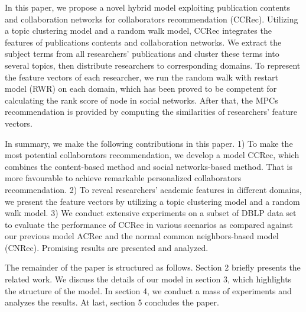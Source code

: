 \documentclass[review]{elsarticle}
\begin{document}
In this paper, we propose a novel hybrid model exploiting publication contents and collaboration networks for collaborators recommendation (CCRec). Utilizing a topic clustering model \cite{pan2010research} \cite{pham2011clustering} and a random walk model, CCRec integrates the features of publications contents and collaboration networks. We extract the subject terms from all researchers' publications and cluster these terms into several topics, then distribute researchers to corresponding domains. To represent the feature vectors of each researcher, we run the random walk with restart model (RWR) on each domain, which has been proved to be competent for calculating the rank score of node in social networks. After that, the MPCs recommendation is provided by computing the similarities of researchers' feature vectors.

In summary, we make the following contributions in this paper. 1) To make the most potential collaborators recommendation, we develop a model CCRec, which combines the content-based method and social networks-based method. That is more favourable to achieve remarkable personalized collaborators recommendation. 2) To reveal researchers' academic features in different domains, we present the feature vectors by utilizing a topic clustering model and a random walk model. 3) We conduct extensive experiments on a subset of DBLP data set to evaluate the performance of CCRec in various scenarios as compared against our previous model ACRec and the normal common neighbors-based model (CNRec). Promising results are presented and analyzed.

The remainder of the paper is structured as follows. Section 2 briefly presents the related work. We discuss the details of our model in section 3, which highlights the structure of the model. In section 4, we conduct a mass of experiments and analyzes the results. At last, section 5 concludes the paper.

\end{document}
